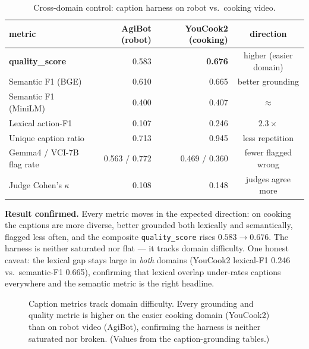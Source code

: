 \documentclass[10pt,letterpaper]{article}
\begin{document}
\begin{table}[H]
\centering
\caption{Cross-domain control: caption harness on robot vs.\ cooking video.}
\begin{tabular}{lrr c}
\toprule
metric & AgiBot (robot) & YouCook2 (cooking) & direction \\
\midrule
\textbf{quality\_score}     & 0.583 & \textbf{0.676} & higher (easier domain) \\
Semantic F1 (BGE)           & 0.610 & 0.665 & better grounding \\
Semantic F1 (MiniLM)        & 0.400 & 0.407 & $\approx$ \\
Lexical action-F1           & 0.107 & 0.246 & $2.3\times$ \\
Unique caption ratio        & 0.713 & 0.945 & less repetition \\
Gemma4 / VCI-7B flag rate   & 0.563 / 0.772 & 0.469 / 0.360 & fewer flagged wrong \\
Judge Cohen's $\kappa$      & 0.108 & 0.148 & judges agree more \\
\bottomrule
\end{tabular}
\end{table}

\textbf{Result confirmed.} Every metric moves in the expected direction: on cooking the captions
are more diverse, better grounded both lexically and semantically, flagged less often, and the
composite \texttt{quality\_score} rises $0.583 \to 0.676$. The harness is neither saturated nor
flat --- it tracks domain difficulty. One honest caveat: the lexical gap stays large in
\emph{both} domains (YouCook2 lexical-F1 0.246 vs.\ semantic-F1 0.665), confirming that lexical
overlap under-rates captions everywhere and the semantic metric is the right headline.

\begin{figure}[H]
\centering
{}
\caption{Caption metrics track domain difficulty. Every grounding and quality metric is higher on
the easier cooking domain (YouCook2) than on robot video (AgiBot), confirming the harness is
neither saturated nor broken. (Values from the caption-grounding tables.)}
\end{figure}
\end{document}
